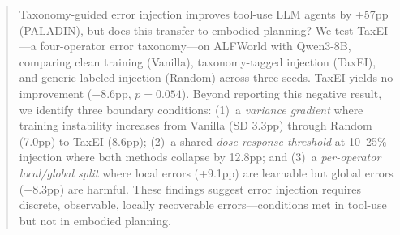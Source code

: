 \begin{abstract}
Taxonomy-guided error injection improves tool-use LLM agents by +57pp (PALADIN), but does this transfer to embodied planning? We test TaxEI---a four-operator error taxonomy---on ALFWorld with Qwen3-8B, comparing clean training (Vanilla), taxonomy-tagged injection (TaxEI), and generic-labeled injection (Random) across three seeds. TaxEI yields no improvement ($-8.6$pp, $p{=}0.054$). Beyond reporting this negative result, we identify three boundary conditions: (1)~a \emph{variance gradient} where training instability increases from Vanilla (SD 3.3pp) through Random (7.0pp) to TaxEI (8.6pp); (2)~a shared \emph{dose-response threshold} at 10--25\% injection where both methods collapse by 12.8pp; and (3)~a \emph{per-operator local/global split} where local errors (+9.1pp) are learnable but global errors ($-8.3$pp) are harmful. These findings suggest error injection requires discrete, observable, locally recoverable errors---conditions met in tool-use but not in embodied planning.
\end{abstract}
